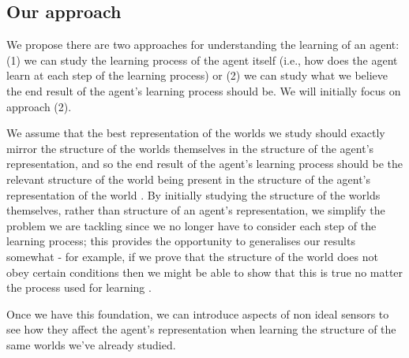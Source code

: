 \subsection{Our approach}

We propose there are two approaches for understanding the learning of an agent: (1) we can study the learning process of the agent itself (i.e., how does the agent learn at each step of the learning process) or (2) we can study what we believe the end result of the agent's learning process should be.
We will initially focus on approach (2).

We assume that the best representation of the worlds we study should exactly mirror the structure of the worlds themselves in the structure of the agent's representation, and so the end result of the agent's learning process should be the relevant structure of the world being present in the structure of the agent's representation of the world
.
By initially studying the structure of the worlds themselves, rather than structure of an agent's representation, we simplify the problem we are tackling since we no longer have to consider each step of the learning process; this provides the opportunity to generalises our results somewhat - for example, if we prove that the structure of the world does not obey certain conditions then we might be able to show that this is true no matter the process used for learning
.

Once we have this foundation, we can introduce aspects of non ideal sensors to see how they affect the agent's representation when learning the structure of the same worlds we've already studied.

